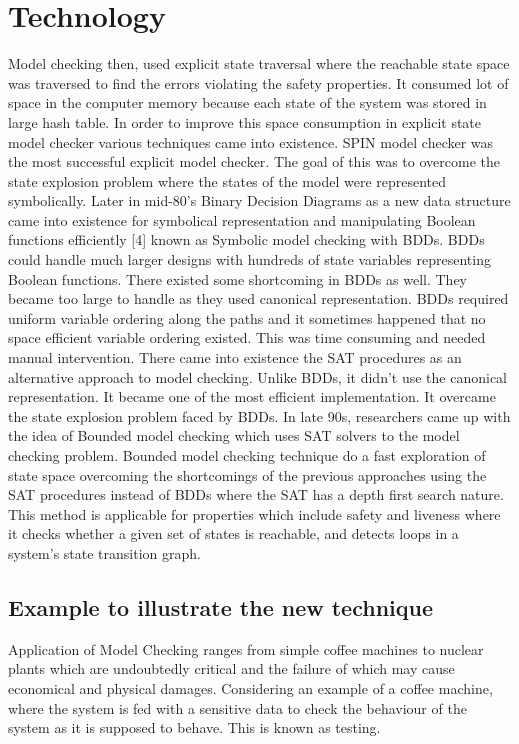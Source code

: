 \documentclass{article}
\begin{document}
\section{Technology}
Model checking then, used explicit state traversal where the reachable state space was traversed to find the errors violating the safety properties. It consumed lot of space in the computer memory because each state of the system was stored in large hash table. In order to improve this space consumption in explicit state model checker various techniques came into existence. SPIN model checker was the most successful explicit model checker. The goal of this was to overcome the state explosion problem where the states of the model were represented symbolically. 
Later in mid-80’s Binary Decision Diagrams as a new data structure came into existence for symbolical representation and manipulating Boolean functions efficiently [4] known as Symbolic model checking with BDDs. BDDs could handle much larger designs with hundreds of state variables representing Boolean functions. There existed some shortcoming in BDDs as well. They became too large to handle as they used canonical representation. BDDs required uniform variable ordering along the paths and it sometimes happened that no space efficient variable ordering existed. This was time consuming and needed manual intervention. 
There came into existence the SAT procedures as an alternative approach to model checking. Unlike BDDs, it didn’t use the canonical representation. It became one of the most efficient implementation. It overcame the state explosion problem faced by BDDs. 
In late 90s, researchers came up with the idea of Bounded model checking which uses SAT solvers to the model checking problem. Bounded model checking technique do a fast exploration of state space overcoming the shortcomings of the previous approaches using the SAT procedures instead of BDDs where the SAT has a depth first search nature. This method is applicable for properties which include safety and liveness where it checks whether a given set of states is reachable, and detects loops in a system’s state transition graph. 

\subsection{Example to illustrate the new technique}
Application of Model Checking ranges from simple coffee machines to nuclear plants which are undoubtedly critical and the failure of which may cause economical and physical damages. Considering an example of a coffee machine, where the system is fed with a sensitive data to check the behaviour of the system as it is supposed to behave. This is known as testing. 
 
\end{document}
